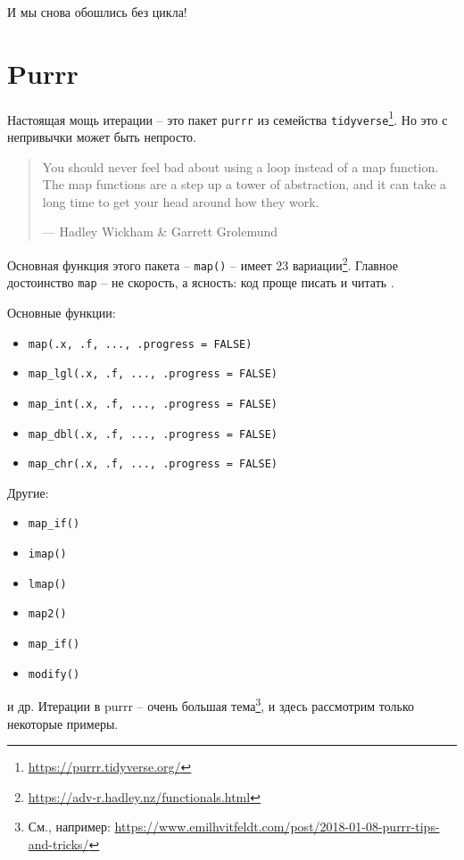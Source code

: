 \documentclass[
]{book}
\providecommand{\tightlist}{%
  \setlength{\itemsep}{0pt}\setlength{\parskip}{0pt}}
\theoremstyle{definition}
\theoremstyle{definition}
\theoremstyle{definition}
\theoremstyle{definition}
\theoremstyle{remark}
\begin{document}
И мы снова обошлись без цикла!

\hypertarget{purrr}{%
\section{Purrr}\label{purrr}}

Настоящая мощь итерации -- это пакет \texttt{purrr} из семейства \texttt{tidyverse}\footnote{\url{https://purrr.tidyverse.org/}}. Но это с непривычки может быть непросто.

\begin{quote}
You should never feel bad about using a loop instead of a map function. The map functions are a step up a tower of abstraction, and it can take a long time to get your head around how they work.

--- Hadley Wickham \& Garrett Grolemund
\end{quote}

Основная функция этого пакета -- \texttt{map()} -- имеет 23 вариации\footnote{\url{https://adv-r.hadley.nz/functionals.html}}. Главное достоинство \texttt{map} -- не скорость, а ясность: код проще писать и читать \citep{wickham2016}.

Основные функции:

\begin{itemize}
\tightlist
\item
  \texttt{map(.x,\ .f,\ ...,\ .progress\ =\ FALSE)}
\item
  \texttt{map\_lgl(.x,\ .f,\ ...,\ .progress\ =\ FALSE)}
\item
  \texttt{map\_int(.x,\ .f,\ ...,\ .progress\ =\ FALSE)}
\item
  \texttt{map\_dbl(.x,\ .f,\ ...,\ .progress\ =\ FALSE)}
\item
  \texttt{map\_chr(.x,\ .f,\ ...,\ .progress\ =\ FALSE)}
\end{itemize}

Другие:

\begin{itemize}
\tightlist
\item
  \texttt{map\_if()}
\item
  \texttt{imap()}
\item
  \texttt{lmap()}
\item
  \texttt{map2()}
\item
  \texttt{map\_if()}
\item
  \texttt{modify()}
\end{itemize}

и др. Итерации в purrr -- очень большая тема\footnote{См., например: \url{https://www.emilhvitfeldt.com/post/2018-01-08-purrr-tips-and-tricks/}}, и здесь рассмотрим только некоторые примеры.
\end{document}
